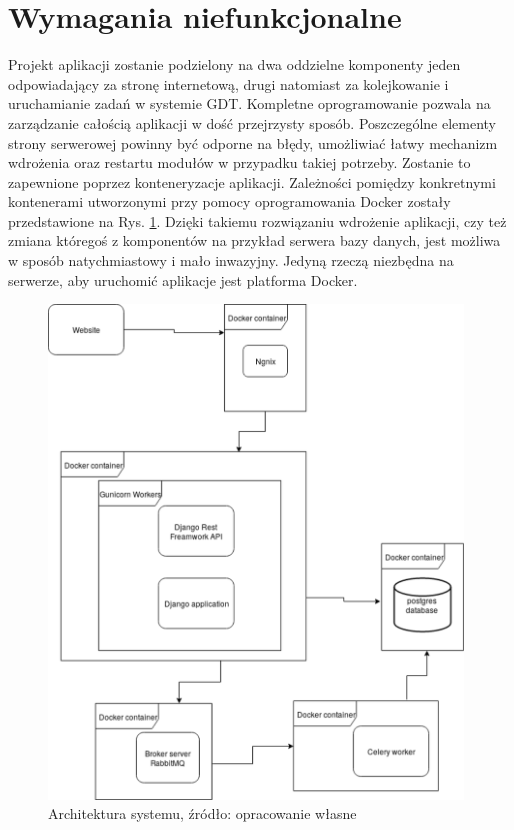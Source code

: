 \section{Wymagania niefunkcjonalne}
Projekt aplikacji zostanie podzielony na dwa oddzielne komponenty jeden odpowiadający za stronę internetową, drugi natomiast za kolejkowanie i uruchamianie zadań w systemie GDT. Kompletne oprogramowanie pozwala na zarządzanie całością aplikacji w dość przejrzysty sposób. Poszczególne elementy strony serwerowej powinny być odporne na błędy, umożliwiać łatwy mechanizm wdrożenia oraz restartu modułów w przypadku takiej potrzeby. Zostanie to zapewnione poprzez konteneryzacje aplikacji. Zależności pomiędzy konkretnymi kontenerami utworzonymi przy pomocy oprogramowania Docker zostały przedstawione na Rys. \ref{rys3_architektura_systemu}. Dzięki takiemu rozwiązaniu wdrożenie aplikacji, czy też zmiana któregoś z komponentów na przykład serwera bazy danych, jest możliwa w sposób natychmiastowy i mało inwazyjny. Jedyną rzeczą niezbędna na serwerze, aby uruchomić aplikacje jest platforma Docker.    

\begin{figure}[htb]
	\centering
	\includegraphics[width=11cm]{grafika/architektura_systemu.eps}
	\caption{Architektura systemu, źródło: opracowanie własne}
	\label{rys3_architektura_systemu}
\end{figure}

